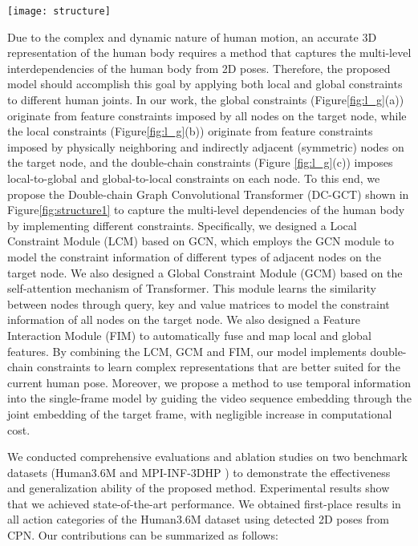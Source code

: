\documentclass[journal]{IEEEtran}
\begin{document}
\begin{figure*}[!t]
  \centering
  \texttt{[image: structure]}
  \caption{Overview of the proposed Double-chain Graph Convolution Transformer (DC-GCT). The DC-GCT consists of  stacked double-chain structures, where each structure splits the channel dimension  into  and , and applies local-to-global and global-to-local constraints to capture the dependencies of human pose, respectively.}
\label{fig:structure1}
\end{figure*}


Due to the complex and dynamic nature of human motion, an accurate 3D representation of the human body requires a method that captures the multi-level interdependencies of the human body from 2D poses. Therefore, the proposed model should accomplish this goal by applying both local and global constraints to different human joints. In our work,  the global constraints (Figure\ref{fig:l_g}(a)) originate from feature constraints imposed by all nodes on the target node, while the local constraints (Figure\ref{fig:l_g}(b)) originate from feature constraints imposed by physically neighboring and indirectly adjacent (symmetric) nodes on the target node, and the double-chain constraints (Figure \ref{fig:l_g}(c)) imposes local-to-global and global-to-local constraints on each node. To this end, we propose the Double-chain Graph Convolutional Transformer (DC-GCT) shown in Figure\ref{fig:structure1} to capture the multi-level dependencies of the human body by implementing different constraints. Specifically, we designed a Local Constraint Module (LCM) based on GCN, which employs the GCN module to model the constraint information of different types of adjacent nodes on the target node. We also designed a Global Constraint Module (GCM) based on the self-attention mechanism of Transformer. This module learns the similarity between nodes through query, key and value matrices to model the constraint information of all nodes on the target node. We also designed a Feature Interaction Module (FIM) to automatically fuse and map local and global features. By combining the LCM, GCM and FIM, our model implements double-chain constraints to learn complex representations that are better suited for the current human pose. Moreover, we propose a method to use temporal information into the single-frame model by guiding the video sequence embedding through the joint embedding of the target frame, with negligible increase in computational cost.


We conducted comprehensive evaluations and ablation studies on two benchmark datasets (Human3.6M \cite{ionescu2013human3} and MPI-INF-3DHP \cite{mehta2017monocular}) to demonstrate the effectiveness and generalization ability of the proposed method. Experimental results show that we achieved state-of-the-art performance. We obtained first-place results in all action categories of the Human3.6M dataset using detected 2D poses from CPN. Our contributions can be summarized as follows:
\end{document}
